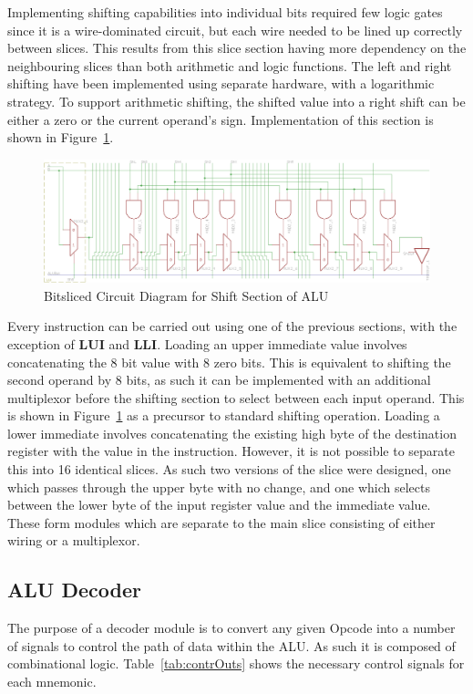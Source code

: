 Implementing shifting capabilities into individual bits required few logic gates since it is a wire-dominated circuit, but each wire needed to be lined up correctly between slices. 
This results from this slice section having more dependency on the neighbouring slices than both arithmetic and logic functions. 
The left and right shifting have been implemented using separate hardware, with a logarithmic strategy. 
To support arithmetic shifting, the shifted value into a right shift can be either a zero or the current operand's sign.
Implementation of this section is shown in Figure~\ref{fig:ShiftSlice}. 


\begin{figure}[h]
	\centering
	\includegraphics[width=\textwidth]{Figures/ShiftSlice.png}
	\caption{Bitsliced Circuit Diagram for Shift Section of ALU}
	\label{fig:ShiftSlice}
\end{figure}

Every instruction can be carried out using one of the previous sections, with the exception of \textbf{LUI} and \textbf{LLI}. 
Loading an upper immediate value involves concatenating the 8 bit value with 8 zero bits. 
This is equivalent to shifting the second operand by 8 bits, as such it can be implemented with an additional multiplexor before the shifting section to select between each input operand. 
This is shown in Figure~\ref{fig:ShiftSlice} as a precursor to standard shifting operation. 
Loading a lower immediate involves concatenating the existing high byte of the destination register with the value in the instruction. 
However, it is not possible to separate this into 16 identical slices. 
As such two versions of the slice were designed, one which passes through the upper byte with no change, and one which selects between the lower byte of the input register value and the immediate value. 
These form modules which are separate to the main slice consisting of either wiring or a multiplexor.

\subsection{ALU Decoder}
The purpose of a decoder module is to convert any given Opcode into a number of signals to control the path of data within the ALU. 
As such it is composed of combinational logic. 
Table~\ref{tab:contrOuts} shows the necessary control signals for each mnemonic.

